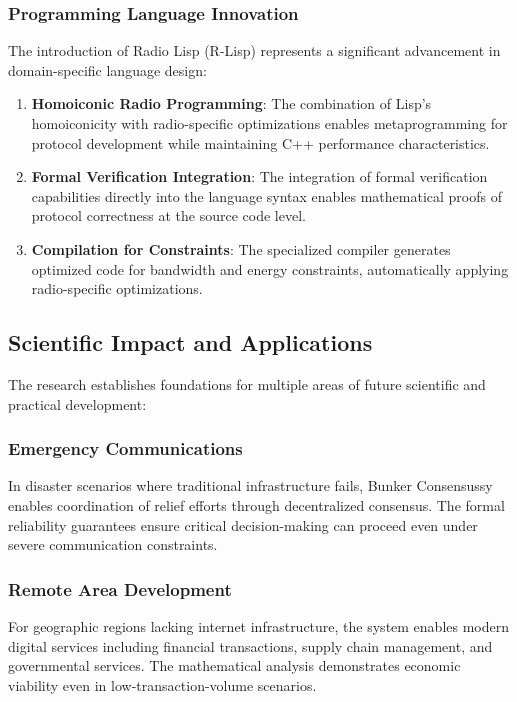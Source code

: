 \documentclass[11pt,a4paper]{article}
\begin{document}
\subsubsection{Programming Language Innovation}

The introduction of Radio Lisp (R-Lisp) represents a significant advancement in domain-specific language design:

\begin{enumerate}
\item \textbf{Homoiconic Radio Programming}: The combination of Lisp's homoiconicity with radio-specific optimizations enables metaprogramming for protocol development while maintaining C++ performance characteristics.

\item \textbf{Formal Verification Integration}: The integration of formal verification capabilities directly into the language syntax enables mathematical proofs of protocol correctness at the source code level.

\item \textbf{Compilation for Constraints}: The specialized compiler generates optimized code for bandwidth and energy constraints, automatically applying radio-specific optimizations.
\end{enumerate}

\subsection{Scientific Impact and Applications}

The research establishes foundations for multiple areas of future scientific and practical development:

\subsubsection{Emergency Communications}

In disaster scenarios where traditional infrastructure fails, Bunker Consensussy enables coordination of relief efforts through decentralized consensus. The formal reliability guarantees ensure critical decision-making can proceed even under severe communication constraints.

\subsubsection{Remote Area Development}

For geographic regions lacking internet infrastructure, the system enables modern digital services including financial transactions, supply chain management, and governmental services. The mathematical analysis demonstrates economic viability even in low-transaction-volume scenarios.
\end{document}
